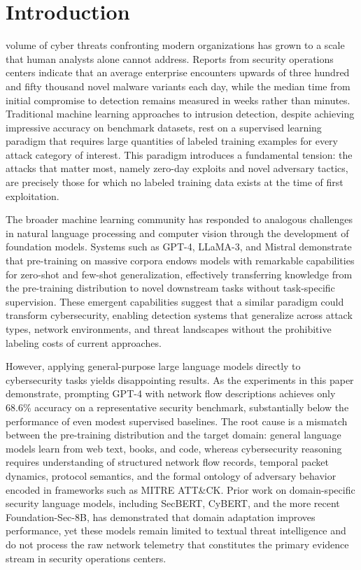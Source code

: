 \documentclass[journal]{IEEEtran}
\begin{document}
\section{Introduction}
\label{sec:introduction}

 volume of cyber threats confronting modern organizations has grown to a scale that human analysts alone cannot address. Reports from security operations centers indicate that an average enterprise encounters upwards of three hundred and fifty thousand novel malware variants each day, while the median time from initial compromise to detection remains measured in weeks rather than minutes. Traditional machine learning approaches to intrusion detection, despite achieving impressive accuracy on benchmark datasets, rest on a supervised learning paradigm that requires large quantities of labeled training examples for every attack category of interest. This paradigm introduces a fundamental tension: the attacks that matter most, namely zero-day exploits and novel adversary tactics, are precisely those for which no labeled training data exists at the time of first exploitation.

The broader machine learning community has responded to analogous challenges in natural language processing and computer vision through the development of foundation models. Systems such as GPT-4, LLaMA-3, and Mistral demonstrate that pre-training on massive corpora endows models with remarkable capabilities for zero-shot and few-shot generalization, effectively transferring knowledge from the pre-training distribution to novel downstream tasks without task-specific supervision. These emergent capabilities suggest that a similar paradigm could transform cybersecurity, enabling detection systems that generalize across attack types, network environments, and threat landscapes without the prohibitive labeling costs of current approaches.

However, applying general-purpose large language models directly to cybersecurity tasks yields disappointing results. As the experiments in this paper demonstrate, prompting GPT-4 with network flow descriptions achieves only 68.6\% accuracy on a representative security benchmark, substantially below the performance of even modest supervised baselines. The root cause is a mismatch between the pre-training distribution and the target domain: general language models learn from web text, books, and code, whereas cybersecurity reasoning requires understanding of structured network flow records, temporal packet dynamics, protocol semantics, and the formal ontology of adversary behavior encoded in frameworks such as MITRE ATT\&CK. Prior work on domain-specific security language models, including SecBERT, CyBERT, and the more recent Foundation-Sec-8B, has demonstrated that domain adaptation improves performance, yet these models remain limited to textual threat intelligence and do not process the raw network telemetry that constitutes the primary evidence stream in security operations centers.
\end{document}

